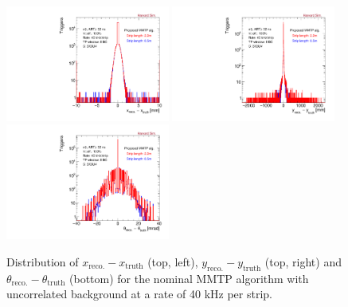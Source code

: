 \begin{figure}[!htpb]
  \begin{center}
    \includegraphics[width=0.48\textwidth]{figures/xres_new.pdf}
    \includegraphics[width=0.48\textwidth]{figures/yres_new.pdf}
    \includegraphics[width=0.48\textwidth]{figures/mres_new.pdf}
  \end{center}
  \vspace{-10pt}
  \caption{Distribution of $x_\text{reco.} - x_\text{truth}$ (top, left), $y_\text{reco.} - y_\text{truth}$ (top, right) and $\theta_\text{reco.} - \theta_\text{truth}$ (bottom) for the nominal MMTP algorithm with uncorrelated background at a rate of 40 kHz per strip.}
  \label{fig:resolutions_old}
\end{figure}

